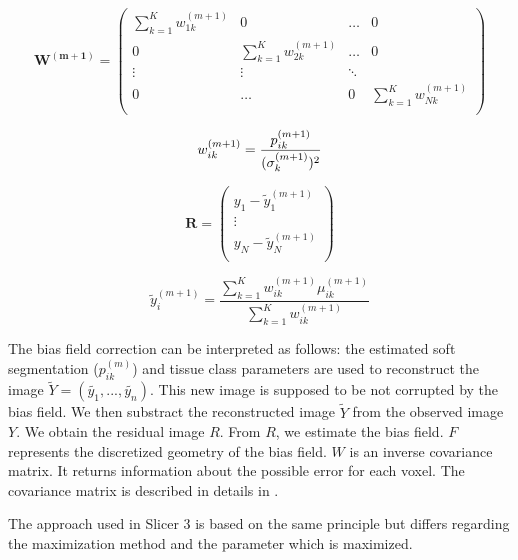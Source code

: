 \begin{itemize}
\begin{itemize}
  \begin{equation*}
   \mathbf{W^{(m+1)}} = \left(
  \begin{array}{clcr}
   \sum_{k=1}^K w_{1k}^{(m+1)} & 0 & \ldots & 0 \\
   0 & \sum_{k=1}^K w_{2k}^{(m+1)} & \ldots & 0 \\
   \vdots & \vdots & \ddots \\
   0 &  \ldots & 0 & \sum_{k=1}^K w_{Nk}^{(m+1)} \\
  \end{array} \right)
  \end{equation*}

  \begin{equation*}
  w_{ik}^{(m+1)}  = \frac{p_{ik}^{(m+1)}}{(\sigma_k^{(m+1)})^2}\\
  \end{equation*}
  
  \begin{equation*}
   \mathbf{R} = \left(
  \begin{array}{cl}
   y_1 - \tilde{y}_1^{(m+1)} \\
   \vdots\\
   y_N - \tilde{y}_N^{(m+1)} \\
  \end{array} \right)
  \end{equation*}
  
  \begin{equation*}
  \tilde{y}_i^{(m+1)}  = \frac{\sum_{k=1}^K w_{ik}^{(m+1)} \mu_{ik}^{(m+1)}}{\sum_{k=1}^K w_{ik}^{(m+1)}}
  \end{equation*}


  \end{itemize}

\end{itemize}

The bias field correction can be interpreted as follows: the estimated soft segmentation ($p_{ik}^{(m)}$) and tissue class parameters are used to reconstruct the image $\tilde{Y}=(\tilde{y_1}, ..., \tilde{y_n})$. This new image is supposed to be not corrupted by the bias field. We then substract the reconstructed image $\tilde{Y}$ from the observed image $Y$. We obtain the residual image $R$. From $R$, we estimate the bias field. $F$ represents the discretized geometry of the bias field. $W$ is an inverse covariance matrix. It returns information about the possible error for each voxel. The covariance matrix is described in details in \cite{17}.
\par
The approach used in Slicer 3 is based on the same principle but differs regarding the maximization method and the parameter which is maximized.
%
